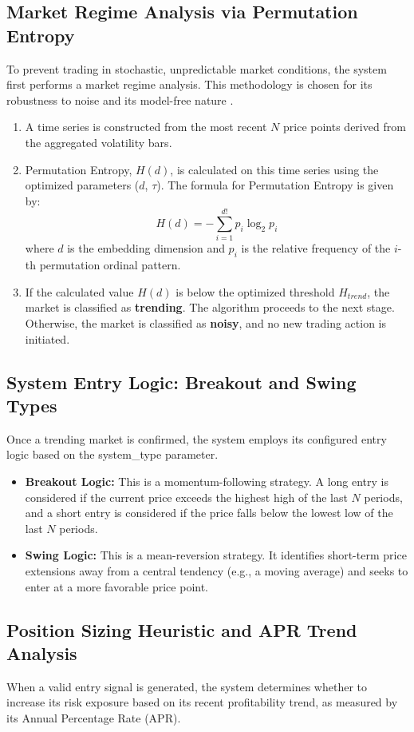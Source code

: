 \documentclass[10pt]{article}
\begin{document}
\subsection{Market Regime Analysis via Permutation Entropy}
To prevent trading in stochastic, unpredictable market conditions, the system first performs a market regime analysis. This methodology is chosen for its robustness to noise and its model-free nature \cite{PhysRevLett.88.174102}.
\begin{enumerate}
    \item A time series is constructed from the most recent $N$ price points derived from the aggregated volatility bars.
    \item Permutation Entropy, $H(d)$, is calculated on this time series using the optimized parameters ($d$, $\tau$). The formula for Permutation Entropy is given by:
    $$H(d) = -\sum_{i=1}^{d!} p_i \log_2 p_i$$
    where $d$ is the embedding dimension and $p_i$ is the relative frequency of the $i$-th permutation ordinal pattern.
    \item If the calculated value $H(d)$ is below the optimized threshold $H_{trend}$, the market is classified as \textbf{trending}. The algorithm proceeds to the next stage. Otherwise, the market is classified as \textbf{noisy}, and no new trading action is initiated.
\end{enumerate}

\subsection{System Entry Logic: Breakout and Swing Types}
Once a trending market is confirmed, the system employs its configured entry logic based on the system\_type parameter.
\begin{itemize}
    \item \textbf{Breakout Logic:} This is a momentum-following strategy. A long entry is considered if the current price exceeds the highest high of the last $N$ periods, and a short entry is considered if the price falls below the lowest low of the last $N$ periods.
    \item \textbf{Swing Logic:} This is a mean-reversion strategy. It identifies short-term price extensions away from a central tendency (e.g., a moving average) and seeks to enter at a more favorable price point.
\end{itemize}

\subsection{Position Sizing Heuristic and APR Trend Analysis}
When a valid entry signal is generated, the system determines whether to increase its risk exposure based on its recent profitability trend, as measured by its Annual Percentage Rate (APR).
\end{document}
